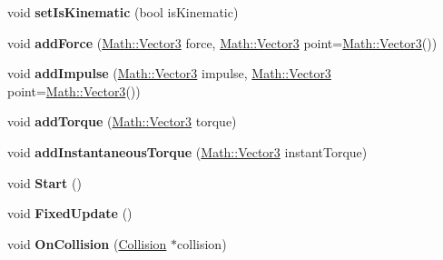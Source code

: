 \begin{DoxyCompactItemize}
\item 
\hypertarget{classBrickware_1_1Core_1_1Rigidbody_a7bc042163837d6157dec8553dd67f249}{}void {\bfseries set\+Is\+Kinematic} (bool is\+Kinematic)\label{classBrickware_1_1Core_1_1Rigidbody_a7bc042163837d6157dec8553dd67f249}

\item 
\hypertarget{classBrickware_1_1Core_1_1Rigidbody_afeadb81722eaac4d6849f3e1af36d40a}{}void {\bfseries add\+Force} (\hyperlink{classBrickware_1_1Math_1_1Vector3}{Math\+::\+Vector3} force, \hyperlink{classBrickware_1_1Math_1_1Vector3}{Math\+::\+Vector3} point=\hyperlink{classBrickware_1_1Math_1_1Vector3}{Math\+::\+Vector3}())\label{classBrickware_1_1Core_1_1Rigidbody_afeadb81722eaac4d6849f3e1af36d40a}

\item 
\hypertarget{classBrickware_1_1Core_1_1Rigidbody_a25b82f1817f3077b1d2bb592f5169f36}{}void {\bfseries add\+Impulse} (\hyperlink{classBrickware_1_1Math_1_1Vector3}{Math\+::\+Vector3} impulse, \hyperlink{classBrickware_1_1Math_1_1Vector3}{Math\+::\+Vector3} point=\hyperlink{classBrickware_1_1Math_1_1Vector3}{Math\+::\+Vector3}())\label{classBrickware_1_1Core_1_1Rigidbody_a25b82f1817f3077b1d2bb592f5169f36}

\item 
\hypertarget{classBrickware_1_1Core_1_1Rigidbody_a605c598eea789fb6d9db0987b1593c02}{}void {\bfseries add\+Torque} (\hyperlink{classBrickware_1_1Math_1_1Vector3}{Math\+::\+Vector3} torque)\label{classBrickware_1_1Core_1_1Rigidbody_a605c598eea789fb6d9db0987b1593c02}

\item 
\hypertarget{classBrickware_1_1Core_1_1Rigidbody_a4a67b5731b31c5515f7af51832aa6cf4}{}void {\bfseries add\+Instantaneous\+Torque} (\hyperlink{classBrickware_1_1Math_1_1Vector3}{Math\+::\+Vector3} instant\+Torque)\label{classBrickware_1_1Core_1_1Rigidbody_a4a67b5731b31c5515f7af51832aa6cf4}

\item 
\hypertarget{classBrickware_1_1Core_1_1Rigidbody_aec2270fbcad93ccb3aac79eeebad24ed}{}void {\bfseries Start} ()\label{classBrickware_1_1Core_1_1Rigidbody_aec2270fbcad93ccb3aac79eeebad24ed}

\item 
\hypertarget{classBrickware_1_1Core_1_1Rigidbody_a7a3f8867aa4e60bf03d8ca42fc67cdbf}{}void {\bfseries Fixed\+Update} ()\label{classBrickware_1_1Core_1_1Rigidbody_a7a3f8867aa4e60bf03d8ca42fc67cdbf}

\item 
\hypertarget{classBrickware_1_1Core_1_1Rigidbody_ab0832d43c7fd509074f951c3481180f3}{}void {\bfseries On\+Collision} (\hyperlink{classBrickware_1_1Core_1_1Collision}{Collision} $\ast$collision)\label{classBrickware_1_1Core_1_1Rigidbody_ab0832d43c7fd509074f951c3481180f3}

\end{DoxyCompactItemize}
